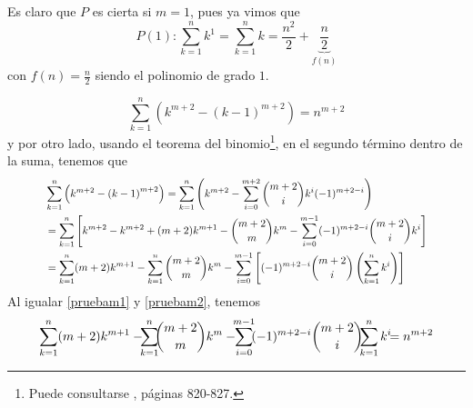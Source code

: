 \begin{parrafoitemize}
\item Es claro que $P$ es cierta si $m=1$, pues ya vimos que
  \begin{equation*}
    P\left( 1\right):\sum_{k=1}^{n}k^1=\sum_{k=1}^{n}k=\frac{n^{2}}{2}+\underset{f\left( n\right) }{\underbrace{\frac{n}{2}}}
  \end{equation*}
  con $f(n)=\frac{n}{2}$ siendo el polinomio de grado $1$.

\item {}
  \begin{equation}\label{pruebam1}
    \sum_{k=1}^{n}\left( k^{m+2}-\left( k-1\right) ^{m+2}\right)=n^{m+2}
  \end{equation}
  y por otro lado, usando el teorema del binomio\footnote{Puede consultarse \textcite{Stewart_2012}, páginas 820-827.},
  en el segundo término dentro de la suma, tenemos que
  \begin{equation}
    \resizebox{.87\textwidth}{!}{$
      \begin{aligned}[b]
        &\sum_{k=1}^{n}\left( k^{m+2}-\left( k-1\right)^{m+2}\right)
        =\sum_{k=1}^{n}\left( k^{m+2}-\sum_{i=0}^{m+2}\binom{m+2}{i}k^{i}(-1)^{m+2-i}\right)\\
        &=\sum_{k=1}^{n}\left[ k^{m+2}-k^{m+2}+(m+2)k^{m+1}-\binom{m+2}{m}k^{m}
        -\sum_{i=0}^{m-1}(-1)^{m+2-i}\binom{m+2}{i}k^{i}\right]\\
        &=\sum_{k=1}^{n}(m+2)k^{m+1}-\sum_{k=1}^{n}\binom{m+2}{m}k^{m}
        -\sum_{i=0}^{m-1}\left[(-1)^{m+2-i}\binom{m+2}{i}\left(\sum_{k=1}^{n}k^{i}\right)\right]
      \end{aligned}
    $}\label{pruebam2}
  \end{equation}
  Al igualar \eqref{pruebam1} y \eqref{pruebam2}, tenemos
  \begin{gather*}
    \sum_{k=1}^{n}(m+2) k^{m+1}-\hspace{-0.15cm}\sum_{k=1}^{n}\hspace{-0.17cm}\binom{m+2}{m}k^{m}
    -\hspace{-0.15cm}\sum_{i=0}^{m-1}\hspace{-0.1cm}(-1)^{m+2-i}\binom{m+2}{i}\hspace{-0.15cm}\sum_{k=1}^{n}k^{i} \hspace{-0.15cm}=n^{m+2}

\end{gather*}
\end{parrafoitemize}
